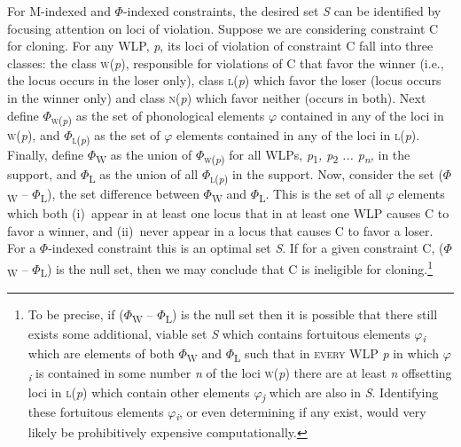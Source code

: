 \documentclass[output=paper,
modfonts
]{LSP/langsci}
\begin{document}
For M-indexed and $\Phi ${}-indexed constraints, the desired set \textit{S} can be identified by focusing attention on loci of violation. Suppose we are considering constraint C for cloning. For any WLP, \textit{p}, its loci of violation of constraint C fall into three classes: the class \textsc{w}(\textit{p}), responsible for violations of C that favor the winner (i.e., the locus occurs in the loser only), class \textsc{l}(\textit{p}) which favor the loser (locus occurs in the winner only) and class \textsc{n}(\textit{p}) which favor neither (occurs in both). Next define $\Phi $\textsc{\textsubscript{w}}\textsubscript{(}\textit{\textsubscript{p}}\textsubscript{)} as the set of phonological elements $\varphi $ contained in any of the loci in \textsc{w}(\textit{p}), and $\Phi $\textsc{\textsubscript{l}}\textsubscript{(}\textit{\textsubscript{p}}\textsubscript{)} as the set of $\varphi $ elements contained in any of the loci in \textsc{l}(\textit{p}). Finally, define $\Phi $\textsubscript{W} as the union of $\Phi $\textsc{\textsubscript{w}}\textsubscript{(}\textit{\textsubscript{p}}\textsubscript{)} for all WLPs, \textit{p}\textsubscript{1}\textit{, p}\textsubscript{2}\textit{ ... p}\textit{\textsubscript{n}}\textit{,} in the support, and $\Phi $\textsubscript{L} as the union of all $\Phi $\textsc{\textsubscript{l}}\textsubscript{(}\textit{\textsubscript{p}}\textsubscript{)} in the support. Now, consider the set ($\Phi $\textsubscript{W} -- $\Phi $\textsubscript{L}), the set difference between $\Phi $\textsubscript{W} and $\Phi $\textsubscript{L}. This is the set of all $\varphi $ elements which both (i)~appear in at least one locus that in at least one WLP causes C to favor a winner, and (ii)~never appear in a locus that causes C to favor a loser. For a $\Phi $-indexed constraint this is an optimal set \textit{S}. If for a given constraint C, ($\Phi $\textsubscript{W} -- $\Phi $\textsubscript{L}) is the null set, then we may conclude that C is ineligible for cloning.\footnote{To be precise, if ($\Phi $\textsubscript{W} -- $\Phi $\textsubscript{L}) is the null set then it is possible that there still exists some additional, viable set \textit{S} which contains fortuitous elements $\varphi $\textit{\textsubscript{i}} which are elements of both $\Phi $\textsubscript{W} and $\Phi $\textsubscript{L} such that in \textsc{every} WLP \textit{p} in which $\varphi $\textit{\textsubscript{i}} is contained in some number \textit{n} of the loci \textsc{w}(\textit{p}) there are at least \textit{n} offsetting loci in \textsc{l}(\textit{p}) which contain other elements $\varphi $\textit{\textsubscript{j}} which are also in \textit{S}. Identifying these fortuitous elements $\varphi $\textit{\textsubscript{i}}, or even determining if any exist, would very likely be prohibitively expensive computationally.}  
\end{document}
